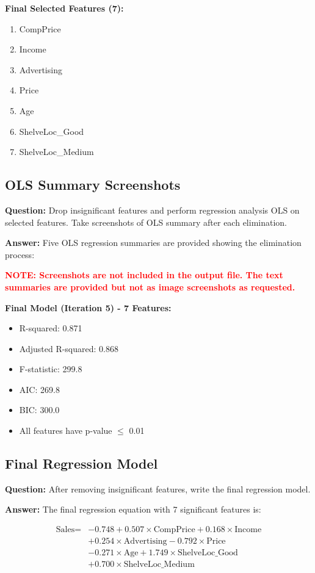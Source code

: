 \documentclass[11pt]{article}
\begin{document}
\textbf{Final Selected Features (7):}
\begin{enumerate}
    \item CompPrice
    \item Income
    \item Advertising
    \item Price
    \item Age
    \item ShelveLoc\_Good
    \item ShelveLoc\_Medium
\end{enumerate}

\subsection{OLS Summary Screenshots}

\textbf{Question:} Drop insignificant features and perform regression analysis OLS on selected features. Take screenshots of OLS summary after each elimination.

\textbf{Answer:} Five OLS regression summaries are provided showing the elimination process:

\textcolor{red}{\textbf{NOTE: Screenshots are not included in the output file. The text summaries are provided but not as image screenshots as requested.}}

\textbf{Final Model (Iteration 5) - 7 Features:}
\begin{itemize}
    \item R-squared: 0.871
    \item Adjusted R-squared: 0.868
    \item F-statistic: 299.8
    \item AIC: 269.8
    \item BIC: 300.0
    \item All features have p-value $\leq$ 0.01
\end{itemize}

\subsection{Final Regression Model}

\textbf{Question:} After removing insignificant features, write the final regression model.

\textbf{Answer:} The final regression equation with 7 significant features is:

\begin{equation}
\begin{aligned}
\text{Sales} = &-0.748 + 0.507 \times \text{CompPrice} + 0.168 \times \text{Income} \\
&+ 0.254 \times \text{Advertising} - 0.792 \times \text{Price} \\
&- 0.271 \times \text{Age} + 1.749 \times \text{ShelveLoc\_Good} \\
&+ 0.700 \times \text{ShelveLoc\_Medium}
\end{aligned}
\end{equation}
\end{document}
